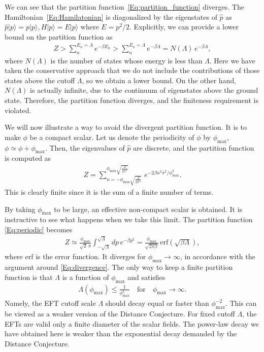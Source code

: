 \documentclass[11pt]{article}
\numberwithin{equation}{section}
\numberwithin{equation}{section}
\theoremstyle{remark}
\begin{document}
We can see that the partition function~\eqref{Eq:partition_function} diverges. The Hamiltonian~\eqref{Eq:Hamilatonian} is diagonalized by the eigenstates of $\hat{p}$ as $\hat{p}|p\rangle=p|p\rangle, H|p\rangle = E |p\rangle$ where $E=p^2/2$.
Explicitly, we can provide a lower bound on the partition function as
\begin{align}
Z > \sum_n^{E_n=\Lambda} e^{-\beta E_n} 
> \sum_n^{E_n=\Lambda} e^{-\beta \Lambda} 
=N(\Lambda) \,e^{-\beta \Lambda} ,
\label{Eq:divergence}\end{align}
where $N(\Lambda)$ is the number of states whose energy is less than $\Lambda$. Here we have taken the conservative approach that we do not include the contributions of those states above the cutoff $\Lambda$, so we obtain a lower bound. On the other hand, $N(\Lambda)$ is actually infinite, due to the continuum of eigenstates above the ground state. 
Therefore, the partition function diverges, and the finiteness requirement is violated.


We will now illustrate a way to avoid the divergent partition function. It is to make $\phi$ be a compact scalar. 
Let us denote the periodicity of $\phi$ by $\phi_\text{max}$, $\phi\simeq \phi+\phi_\text{max}$.
Then, the eigenvalues of $\hat{p}$ are discrete, and the partition function is computed as
\begin{align}
Z=\sum_{n=-\phi_\text{max}\sqrt{\frac{\Lambda}{2\pi^2}}}^{\phi_\text{max}\sqrt{\frac{\Lambda}{2\pi^2}}} \,e^{-2\beta n^2\pi^2/\phi_\text{max}^2}.
\label{Eq:periodic}\end{align}
This is clearly finite since it is the sum of a finite number of terms.

By taking $\phi_\text{max}$ to be large, an effective non-compact scalar is obtained.
It is instructive to see what happens when we take this limit.
The partition function \eqref{Eq:periodic} becomes
\begin{align}
Z\simeq \frac{\phi_\text{max}}{\sqrt{2}\,\pi} \int^{\sqrt{\Lambda}}_{-\sqrt{\Lambda}} dp\, e^{-\beta p^2}
=\frac{\phi_\text{max}}{\sqrt{2\pi\beta}}\,\mathrm{erf}\left(\sqrt{\beta\Lambda}\right),
\end{align}
where $\mathrm{erf}$ is the error function.
It diverges for $\phi_\text{max}\to\infty$, in accordance with the argument around \eqref{Eq:divergence}.
The only way to keep a finite partition function is that $\Lambda$ is a function of $\phi_\text{max}$ and satisfies
\begin{align}
\Lambda\left(\phi_\text{max}\right) \leq \frac{1}{\phi_\text{max}^2}\quad \text{for} \quad  \phi_\text{max}\to\infty.
\label{Eq:bound}\end{align}
Namely, the EFT cutoff scale $\Lambda$ should decay equal or faster than $\phi_\text{max}^{-2}$.
This can be viewed as a weaker version of the Distance Conjecture.
For fixed cutoff $\Lambda$, the EFTs are valid only a finite diameter of the scalar fields.
The power-law decay we have obtained here is weaker than the exponential decay demanded by the Distance Conjecture.
\end{document}
